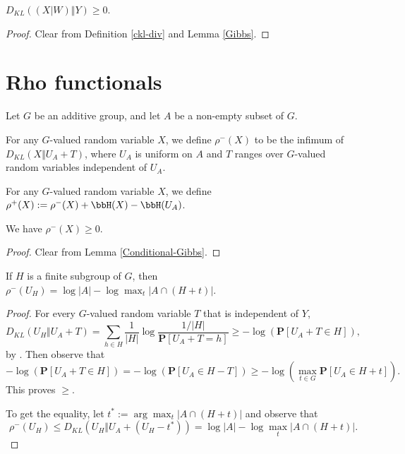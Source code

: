 \begin{lemma}\label{Conditional-Gibbs}\leanok  $D_{KL}((X|W)\Vert Y) \geq 0$.
\end{lemma}

\begin{proof}  Clear from Definition \ref{ckl-div} and Lemma \ref{Gibbs}.
\end{proof}

\section{Rho functionals}

Let $G$ be an additive group, and let $A$ be a non-empty subset of $G$.

\begin{definition}\label{rhominus-def}\leanok  For any $G$-valued random variable $X$, we define $\rho^-(X)$ to be the infimum of $D_{KL}(X \Vert  U_A + T)$, where $U_A$ is uniform on $A$ and $T$ ranges over $G$-valued random variables independent of $U_A$.
\end{definition}

\begin{definition}\label{rhoplus-def}\leanok  For any $G$-valued random variable $X$, we define $\rho^+(X) := \rho^-(X) + \bbH(X) - \bbH(U_A)$.
\end{definition}

\begin{lemma}\label{rhominus-nonneg}\label{rhoMinus_nonneg}\leanok  We have $\rho^-(X) \geq 0$.
\end{lemma}

\begin{proof} Clear from Lemma \ref{Conditional-Gibbs}.
\end{proof}

\begin{lemma}\label{rhominus-subgroup}\leanok If $H$ is a finite subgroup of $G$, then $\rho^-(U_H) = \log |A| - \log \max_t |A \cap (H+t)|$.
\end{lemma}

\begin{proof}
  For every $G$-valued random variable $T$ that is independent of $Y$,
  $$D_{KL}(U_H \Vert U_A+T) = \sum_{h\in H} \frac{1}{|H|}\log\frac{1/|H|}{\mathbf{P}[U_A+T=h]}\ge -\log(\mathbf{P}[U_A+T\in H]),$$
  by . Then observe that $$-\log(\mathbf{P}[U_A+T\in H])=-\log(\mathbf{P}[U_A\in H-T])\ge -\log(\max_{t\in G} \mathbf{P}[U_A\in H+t]).$$ This proves $\ge$.

  To get the equality, let $t^*:=\arg\max_t |A \cap (H+t)|$ and observe that $$\rho^-(U_H)\le D_{KL}(U_H \Vert  U_A+(U_H-t^*))= \log |A| - \log \max_t|A \cap (H+t)|.$$
\end{proof}

